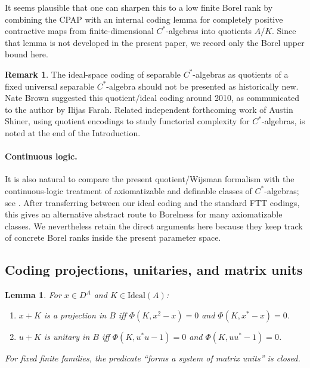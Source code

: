 \documentclass[12pt,fleqn,a4paper]{amsart}
\numberwithin{equation}{section}
\newtheorem{lemma}[theorem]{Lemma}
\theoremstyle{definition}
\newtheorem{remark}[theorem]{Remark}
\newcommand{\Ideal}{\mathrm{Ideal}}
\begin{document}
It seems plausible that one can sharpen this to a low finite Borel rank by combining the
CPAP with an internal coding lemma for completely positive contractive maps from
finite-dimensional $C^*$-algebras into quotients $A/K$.  Since that lemma is not
developed in the present paper, we record only the Borel upper bound here.

\begin{remark}
\label{rem:ideal-coding-history}
The ideal-space coding of separable $C^*$-algebras as quotients of a fixed universal
separable $C^*$-algebra should not be presented as historically new.  Nate Brown
suggested this quotient/ideal coding around 2010, as communicated to the author by
Ilijas Farah.  Related independent forthcoming work of Austin Shiner, using quotient
encodings to study functorial complexity for $C^*$-algebras, is noted at the end of
the Introduction.
\end{remark}


\paragraph{Continuous logic.}
It is also natural to compare the present quotient/Wijsman formalism with the
continuous-logic treatment of axiomatizable and definable classes of $C^*$-algebras;
see \cite{FarahHartLupiniRobertTikuisisVignatiWinter}.  After transferring between
our ideal coding and the standard FTT codings, this gives an alternative abstract
route to Borelness for many axiomatizable classes.  We nevertheless retain the
direct arguments here because they keep track of concrete Borel ranks inside the
present parameter space.

\subsection{Coding projections, unitaries, and matrix units}

\begin{lemma}\label{lem:basic-coding}
For $x\in D^A$ and $K\in\Ideal(A)$:
\begin{enumerate}
\item $x+K$ is a projection in $B$ iff $\Phi(K,x^2-x)=0$ and $\Phi(K,x^*-x)=0$.
\item $u+K$ is unitary in $B$ iff $\Phi(K,u^*u-1)=0$ and $\Phi(K,uu^*-1)=0$.
\end{enumerate}
For fixed finite families, the predicate ``forms a system of matrix units'' is closed.
\end{lemma}
\end{document}
